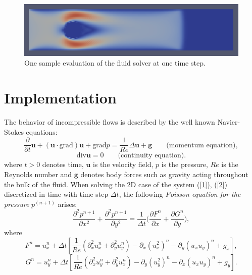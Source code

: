 \documentclass[a4paper, 10pt]{article}
\renewcommand{\vec}[1]{\mathbf{#1}}
\begin{document}
\begin{figure}
	\centering
	\includegraphics[scale=0.7]{img/1.png}
	\caption{One sample evaluation of the fluid solver at one time step.}
\end{figure}

\section{Implementation}
The behavior of incompressible flows is described by the well known Navier-Stokes equations:
\begin{equation}
\label{1}
\frac{\partial}{\partial t}\vec{u} + (\vec{u} \cdot \text{grad})\vec{u} + \textrm{grad}p =\frac{1}{Re}\Delta\vec{u}+\vec{g} \qquad \textrm{(momentum equation)},
\end{equation}
\begin{equation}
\label{2}
\textrm{div}\vec{u} = 0 \qquad \textrm{(continuity equation)}.
\end{equation}
where $ t > 0 $ denotes time, $ \vec{u} $ is the velocity field, $p$ is the pressure, $ Re $ is the Reynolds number and $ \vec{g} $ denotes body forces such as gravity acting throughout the bulk of the fluid. When solving the 2D case of the system (\ref{1}), (\ref{2}) discretized in time with time step $ \Delta t $, the following \textit{Poisson equation for the pressure} $p^{(n+1)}$ arises:
\begin{equation}
\label{3}
\frac{\partial^2p^{n+1}}{\partial x^2} + \frac{\partial^2p^{n+1}}{\partial y^2} = \frac{1}{\Delta t}\Big(\frac{\partial F^{n}}{\partial x} + \frac{\partial G^{n}}{\partial y}\Big),
\end{equation}
where
\begin{equation*}
F^{n} = u_x^{n} + \Delta t \left[ \frac{1}{Re}\left( \partial_x^{2} u_x^n + \partial_y^{2} u_y^n \right) - \partial_x (u_x^2)^n - \partial_y (u_x u_y)^n + g_x \right],  
\end{equation*}
\begin{equation*}
G^{n} = u_y^{n} + \Delta t \left[ \frac{1}{Re}\left( \partial_x^{2} u_y^n + \partial_y^{2} u_x^n \right) - \partial_y (u_y^2)^n - \partial_x (u_x u_y)^n + g_y \right].
\end{equation*}
\end{document}
